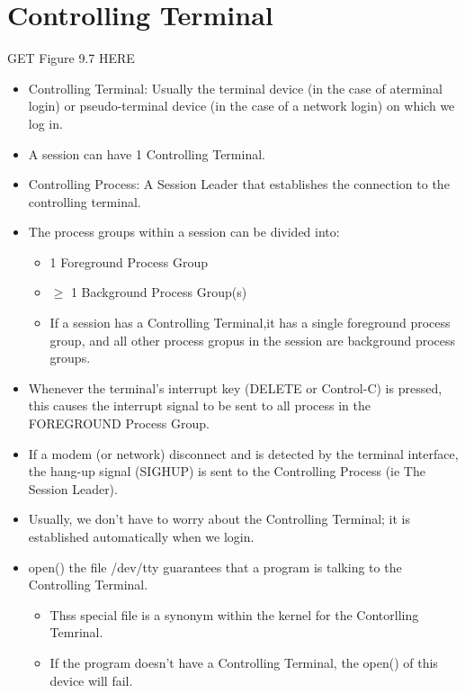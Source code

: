 \documentclass{article}
\begin{document}
\section{Controlling Terminal}
GET Figure 9.7 HERE \newline
\begin{itemize}
\item Controlling Terminal: Usually the terminal device (in the case of aterminal login) or pseudo-terminal device (in the case of a network login) on which we log in.
\item A session can have 1 Controlling Terminal.
\item Controlling Process: A Session Leader that establishes the connection to the controlling terminal.
\item The process groups within a session can be divided into:
    \begin{itemize}
        \item 1 Foreground Process Group
        \item $\geq$ 1 Background Process Group(s)
        \item If a session has a Controlling Terminal,it has a single foreground process group, and all other process gropus in the session are background process groups.
    \end{itemize}
\item Whenever the terminal's interrupt key (DELETE or Control-C) is pressed, this causes the interrupt signal to be sent to all process in the FOREGROUND Process Group.
\item If a modem (or network) disconnect and is detected by the terminal interface, the hang-up signal (SIGHUP) is sent to the Controlling Process (ie The Session Leader).
\item Usually, we don't have to worry about the Controlling Terminal; it is established automatically when we login.
\item open() the file /dev/tty guarantees that a program is talking to the Controlling Terminal.
    \begin{itemize}
        \item Thss special file is a synonym within the kernel for the Contorlling Temrinal.
        \item If the program doesn't have a Controlling Terminal, the open() of this device will fail.
    \end{itemize}

\end{itemize}
\end{document}
